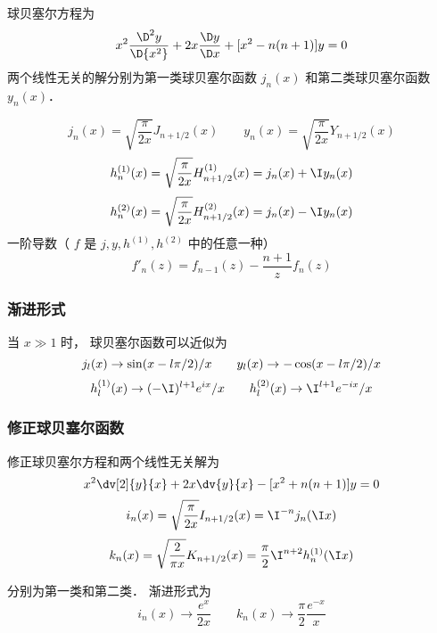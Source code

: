 
球贝塞尔方程为
 \begin{equation}
{x^2}\frac{{{\D ^2}y}}{{\D {x^2}}} + 2x\frac{{\D y}}{{\D x}} + [{x^2} - n(n + 1)]y = 0
\end{equation}
两个线性无关的解分别为第一类球贝塞尔函数 ${j_n}(x)$ 和第二类球贝塞尔函数 ${y_n}(x)$．  

 \begin{equation}
{j_n}(x) = \sqrt {\frac{\pi }{{2x}}} {J_{n + 1/2}}(x)
\qquad
{y_n}(x) = \sqrt {\frac{\pi }{{2x}}} {Y_{n + 1/2}}(x)
\end{equation}
 \begin{equation}
h_n^{(1)}(x) = \sqrt {\frac{\pi }{{2x}}} H_{n + 1/2}^{(1)}(x) = {j_n}(x) + \I y_n(x)
\end{equation}
 \begin{equation}
h_n^{(2)}(x) = \sqrt {\frac{\pi }{{2x}}} H_{n + 1/2}^{(2)}(x) = {j_n}(x) - \I y_n(x)
\end{equation}
一阶导数（ $f$ 是 $j,y,{h^{(1)}},{h^{(2)}}$ 中的任意一种）
\begin{equation}
{f'_n}(z) = {f_{n - 1}}(z) - \frac{{n + 1}}{z}{f_n}(z)
\end{equation}

\subsubsection{渐进形式}
当 $x \gg 1$ 时， 球贝塞尔函数可以近似为
 \begin{equation}
{j_l}(x) \to \sin (x - l\pi /2)/x
\qquad
{y_l}(x{\rm{)}} \to  - \cos (x - l\pi /2)/x
\end{equation}
 \begin{equation}
h_l^{(1)}(x) \to {( -\I)^{l + 1}}{e^{ix}}/x
\qquad
h_l^{(2)}(x) \to {\I^{l + 1}}{e^{ - ix}}/x
\end{equation}
    

\subsubsection{修正球贝塞尔函数}

修正球贝塞尔方程和两个线性无关解为
 \begin{equation}
 {x^2}\dv[2]{y}{x} + 2x\dv{y}{x} - [x^2 + n(n + 1)]y = 0
\end{equation}
 \begin{equation}
 {i_n}(x) = \sqrt {\frac{\pi }{{2x}}} {I_{n + 1/2}}(x) = {\I^{ - n}}{j_n}(\I x)
 \end{equation}
 \begin{equation}
{k_n}(x) = \sqrt {\frac{2}{{\pi x}}} {K_{n + 1/2}}(x) = \frac{\pi }{2}{\I^{n + 2}}h_n^{(1)}(\I x)
\end{equation}


分别为第一类和第二类． 渐进形式为
  \begin{equation}
{i_n}(x) \to \frac{{{e^x}}}{{2x}}
\qquad
{k_n}(x) \to \frac{\pi }{2}\frac{{{e^{ - x}}}}{x}
\end{equation}

